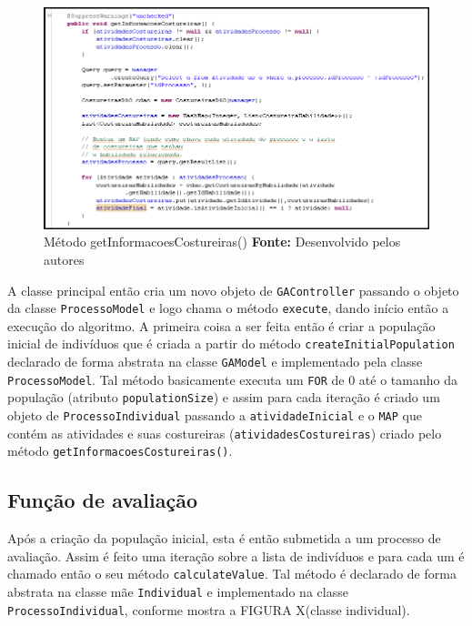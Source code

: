 \begin{figure}[h!]
	\centerline{\includegraphics[scale=0.7]{./imagens/metodo_informacoes_costureiras.png}}
	\caption[Distribuição de lotes]
	{Método getInformacoesCostureiras() \textbf{Fonte:} Desenvolvido pelos autores}
	\label{fig:exemplo1}
\end{figure}



\par A classe principal então cria um novo objeto de \texttt{GAController} passando o objeto da classe \texttt{ProcessoModel} e
logo chama o método \texttt{execute}, dando início então a execução do algoritmo. A primeira coisa a ser feita então é criar
a população inicial de indivíduos que é criada a partir do método \texttt{createInitialPopulation} declarado de forma 
abstrata na classe \texttt{GAModel} e implementado pela classe \texttt{ProcessoModel}. Tal método basicamente executa um 
\texttt{FOR} de 0 até o tamanho da população (atributo \texttt{populationSize}) e assim para cada iteração é criado um objeto de \texttt{ProcessoIndividual} passando a \texttt{atividadeInicial} e o \texttt{MAP} que contém as atividades e suas costureiras (\texttt{atividadesCostureiras}) criado pelo método \texttt{getInformacoesCostureiras()}.



\subsection{Função de avaliação}
\par Após a criação da população inicial, esta é então submetida a um processo de avaliação. Assim é feito uma iteração sobre
a lista de indivíduos e para cada um é chamado então o seu método \texttt{calculateValue}.
Tal método é declarado de forma abstrata na classe mãe \texttt{Individual} e implementado na classe \texttt{ProcessoIndividual}, 
conforme mostra a FIGURA X(classe individual).

